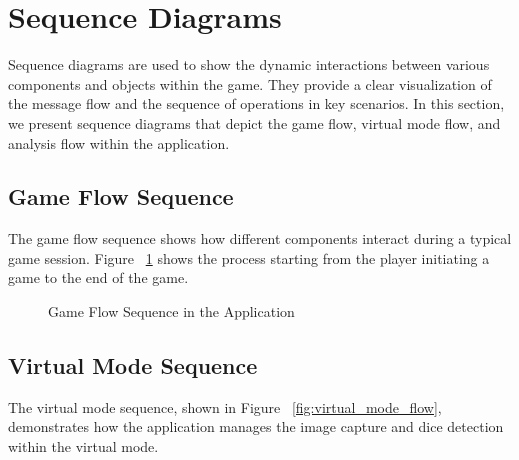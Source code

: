 \section{Sequence Diagrams}

Sequence diagrams are used to show the dynamic interactions between various components and objects within the game. They provide a clear visualization of the message flow and the sequence of operations in key scenarios. In this section, we present sequence diagrams that depict the game flow, virtual mode flow, and analysis flow within the application.

\subsection{Game Flow Sequence}

The game flow sequence shows how different components interact during a typical game session. Figure ~\ref{fig:game_flow} shows the process starting from the player initiating a game to the end of the game.

\begin{figure}[ht!]
    \centering
    
    \caption{Game Flow Sequence in the Application}
    \label{fig:game_flow}
\end{figure}


\subsection{Virtual Mode Sequence}

The virtual mode sequence, shown in Figure ~\ref{fig:virtual_mode_flow}, demonstrates how the application manages the image capture and dice detection within the virtual mode.

